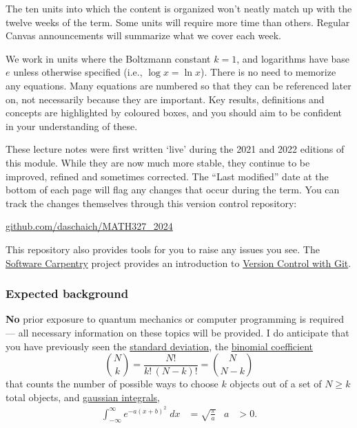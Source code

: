 The ten units into which the content is organized won't neatly match up with the twelve weeks of the term.
Some units will require more time than others.
Regular Canvas announcements will summarize what we cover each week.

We work in units where the Boltzmann constant $k = 1$, and logarithms have base $e$ unless otherwise specified (i.e., $\log x = \ln x$).
There is no need to memorize any equations.
Many equations are numbered so that they can be referenced later on, not necessarily because they are important.
Key results, definitions and concepts are highlighted by coloured boxes, and you should aim to be confident in your understanding of these.

These lecture notes were first written `live' during the 2021 and 2022 editions of this module.
While they are now much more stable, they continue to be improved, refined and sometimes corrected.
The ``Last modified'' date at the bottom of each page will flag any changes that occur during the term.
You can track the changes themselves through this version control repository: \\
\centerline{\href{https://github.com/daschaich/MATH327_2024}{github.com/daschaich/MATH327\_2024}}
This repository also provides tools for you to raise any issues you see.
The \href{https://software-carpentry.org}{Software Carpentry} project provides an introduction to \href{https://swcarpentry.github.io/git-novice/}{Version Control with Git}.

\subsubsection*{Expected background}
\textbf{No} prior exposure to quantum mechanics or computer programming is required --- all necessary information on these topics will be provided.
I do anticipate that you have previously seen the \href{https://en.wikipedia.org/wiki/Standard_deviation}{standard deviation}, the \href{https://en.wikipedia.org/wiki/Binomial_coefficient}{binomial coefficient}
\begin{equation*}
  \binom{N}{k} = \frac{N!}{k! \, (N - k)!} = \binom{N}{N - k}
\end{equation*}
that counts the number of possible ways to choose $k$ objects out of a set of $N \geq k$ total objects, and \href{https://en.wikipedia.org/wiki/Gaussian_integral}{gaussian integrals},
\begin{align*} %
  \int_{-\infty}^{\infty} e^{-a (x + b)^2} \; dx & = \sqrt{\frac{\pi}{a}} &
  a & > 0.
\end{align*}

